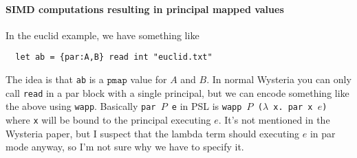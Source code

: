 \documentclass[10pt]{article}
\newcommand{\isec}{\ensuremath{\mathtt{pmap}}}
\begin{document}
\paragraph{SIMD computations resulting in principal mapped values} In
the euclid example, we have something like
\begin{verbatim}
  let ab = {par:A,B} read int "euclid.txt"
\end{verbatim}
The idea is that \verb+ab+ is a $\isec$ value for $A$ and $B$. In
normal Wysteria you can only call \texttt{read} in a par block with a
single principal, but we can encode something like the above using
\texttt{wapp}. Basically \texttt{par $P$ e} in PSL is \texttt{wapp $P$
  ($\lambda$ x. par x $e$)} where \texttt{x} will be bound to the principal
executing $e$. It's not mentioned in the Wysteria paper, but I suspect
that the lambda term should executing $e$ in par mode anyway, so I'm
not sure why we have to specify it.
\end{document}
